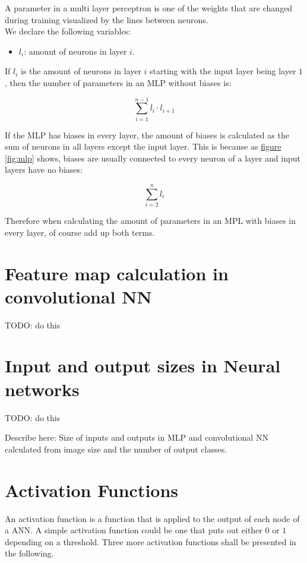 A parameter in a multi layer perceptron is one of the weights that are changed during training visualized by the lines between neurons.\\

We declare the following variables:
\begin{itemize}
    \item $l_{i}$: amount of neurons in layer $i$.
\end{itemize}

If $l_{i}$ is the amount of neurons in layer $i$ starting with the input layer being layer $1$, then the number of parameters in an MLP without biases is:

$$
    \sum_{i=1}^{n-1}l_{i}\cdot{l_{i+1}}
$$

If the MLP has biases in every layer, the amount of biases is calculated as the sum of neurons in all layers except the input layer. This is because as \hyperref[fig:mlp]{figure \ref*{fig:mlp}} shows, biases are usually connected to every neuron of a layer and input layers have no biases:

$$
    \sum_{i=2}^{n}l_{i}
$$

Therefore when calculating the amount of parameters in an MPL with biases in every layer, of course add up both terms.

\section{Feature map calculation in convolutional NN}

TODO: do this

\section{Input and output sizes in Neural networks}

TODO: do this

Describe here: Size of inputs and outputs in MLP and convolutional NN calculated from image size and the number of output classes.


\section{Activation Functions}
\label{sec:activation_functions}

An activation function is a function that is applied to the output of each node of a ANN. A simple activation function could be one that puts out either $0$ or $1$ depending on a threshold. Three more activation functions shall be presented in the following.

